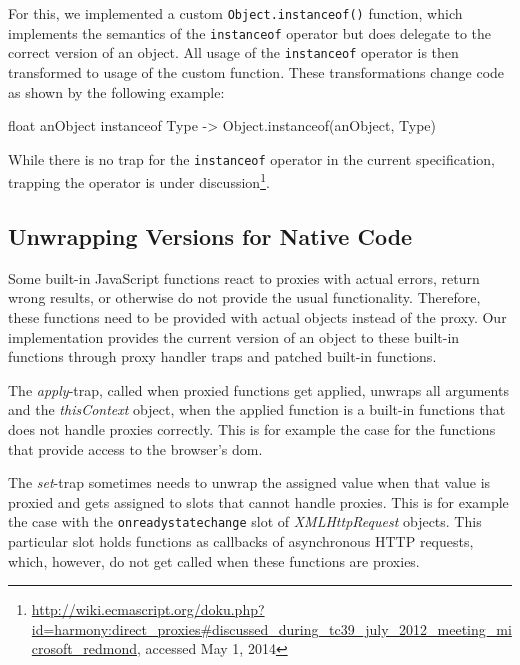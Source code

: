 For this, we implemented a custom \lstinline{Object.instanceof()} function, which implements the semantics of the \lstinline{instanceof} operator but does delegate to the correct version of an object.
All usage of the \lstinline{instanceof} operator is then transformed to usage of the custom function.
These transformations change code as shown by the following example: 

\begin{code}[]{}{float}
anObject instanceof Type -> Object.instanceof(anObject, Type)
\end{code}
\iffalse
\end{verbatim}\fi

While there is no trap for the \lstinline{instanceof} operator in the current specification, trapping the operator is under discussion\footnote{\url{http://wiki.ecmascript.org/doku.php?id=harmony:direct_proxies\#discussed_during_tc39_july_2012_meeting_microsoft_redmond}, accessed May 1, 2014}.


\subsection{Unwrapping Versions for Native Code} \label{subsec:IMPLEMENTATION:4.3}

Some built-in JavaScript functions react to proxies with actual errors, return wrong results, or otherwise do not provide the usual functionality.
Therefore, these functions need to be provided with actual objects instead of the proxy.
Our implementation provides the current version of an object to these built-in functions through proxy handler traps and patched built-in functions.

The \emph{apply}-trap, called when proxied functions get applied, unwraps all arguments and the \emph{thisContext} object, when the applied function is a built-in functions that does not handle proxies correctly.
This is for example the case for the functions that provide access to the browser's \ac{dom}.

The \emph{set}-trap sometimes needs to unwrap the assigned value when that value is proxied and gets assigned to slots that cannot handle proxies.
This is for example the case with the \lstinline{onreadystatechange} slot of \emph{XMLHttpRequest} objects.
This particular slot holds functions as callbacks of asynchronous HTTP requests, which, however, do not get called when these functions are proxies.

